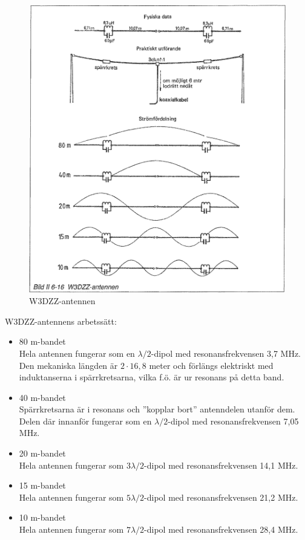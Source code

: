 \begin{figure}
  \includegraphics[width=\textwidth]{images/bild_2_6-16}
  \caption{W3DZZ-antennen}
  \label{fig:bildII6-16}
\end{figure}

W3DZZ-antennens arbetssätt:
\begin{itemize}
  \item 80 m-bandet \\ Hela antennen fungerar som en
    \(\lambda/2\)-dipol med resonansfrekvensen 3,7 MHz.  Den mekaniska
    längden är \(2 \cdot 16,8\) meter och förlängs elektriskt med
    induktanserna i spärrkretsarna, vilka f.ö. är ur resonans på detta
    band.
  \item 40 m-bandet \\ Spärrkretsarna är i resonans och ''kopplar
    bort'' antenndelen utanför dem. Delen där innanför fungerar som en
    \(\lambda/2\)-dipol med resonansfrekvensen 7,05 MHz.

  \item 20 m-bandet \\ Hela antennen fungerar som \(3\lambda/2\)-dipol
    med resonansfrekvensen 14,1 MHz.

  \item 15 m-bandet \\ Hela antennen fungerar som \(5\lambda/2\)-dipol
    med resonansfrekvensen 21,2 MHz.

  \item 10 m-bandet \\ Hela antennen fungerar som \(7\lambda/2\)-dipol
    med resonansfrekvensen 28,4 MHz.
\end{itemize}
